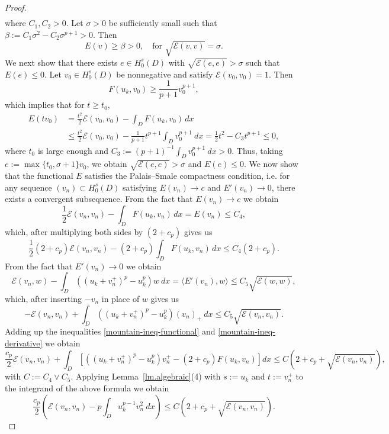 \documentclass[11pt,a4paper,reqno]{amsart}
\theoremstyle{definition}
\numberwithin{equation}{section}
\begin{document}
\begin{proof}
\begin{align*}
\end{align*}
where $C_1,C_2>0$. Let $\sigma>0$ be sufficiently small such that $\beta:=C_1\sigma^2-C_2\sigma^{p+1}>0$. Then
\[
E(v)\ge \beta>0,\quad \text{for }\sqrt{\mathcal E(v,v)}=\sigma.
\]
We next show that there exists $e\in H^s_0(D)$ with $\sqrt{\mathcal E(e,e)}>\sigma$ such that $E(e)\le 0$. 
Let $v_0\in H^s_0(D)$ be nonnegative and satisfy $\mathcal E(v_0,v_0)=1$. Then
\[
F(u_k,v_0)\ge \frac{1}{p+1}v_0^{p+1},
\]
which implies that for $t\ge t_0$,
\[
\begin{split}
E(tv_0)&=\frac{t^2}{2}\mathcal E(v_0,v_0)-\int_D F(u_k,v_0)\,dx\\&
\le \frac{t^2}{2}\mathcal E(v_0,v_0)-\frac{1}{p+1}t^{p+1}\int_D v_0^{p+1}\ dx= \frac{1}{2}t^2-C_3t^{p+1}\le 0,
\end{split}
\]
where $t_0$ is large enough and $C_3:=(p+1)^{-1}\int_D v_0^{p+1}\ dx>0$. Thus, taking $e:=\max\{t_0,\sigma+1\}v_0$, we obtain $\sqrt{\mathcal E(e,e)}>\sigma$ and $E(e)\le0$.
We now show that the functional $E$ satisfies the Palais–Smale compactness condition, i.e. for any sequence $(v_n)\subset H^s_0(D)$ 
satisfying $E(v_n)\to c$ and $E'(v_n)\to0$, 
there exists a convergent subsequence. 
From the fact that $E(v_n)\to c$ we obtain
\[
\frac{1}{2}\mathcal E(v_n,v_n)-\int_D F(u_k,v_n)\,dx=E(v_n)\le C_4,
\]
which, after multiplying both sides by $(2+c_p)$ gives us
\begin{equation}\label{mountain-ineq-functional}
\frac{1}{2}(2+c_p)\mathcal E(v_n,v_n)-(2+c_p)\int_D F(u_k,v_n)\,dx\le C_4(2+c_p).
\end{equation}
From the fact that $E'(v_n)\to 0$ we obtain
\[
\mathcal{E}(v_n,w)-\int_D \left((u_k+v_n^+)^p-u_k^p\right)w\ dx=\langle E'(v_n), w\rangle \le C_5\sqrt{\mathcal E(w,w)},
\]
which, after inserting $-v_n$ in place of $w$ gives us
\begin{equation}\label{mountain-ineq-derivative}
-\mathcal E(v_n,v_n)+\int_D \left((u_k+v_n^+)^p-u_k^p\right)(v_n)_+\ dx\le C_5\sqrt{\mathcal E(v_n,v_n)}.
\end{equation}
Adding up the inequalities \eqref{mountain-ineq-functional} and \eqref{mountain-ineq-derivative} we obtain
\[
\frac{c_p}{2}\mathcal E(v_n,v_n)+\int_D \left[\left((u_k+v_n^+)^p-u_k^p\right)v_n^+-(2+c_p)F(u_k,v_n)\right]dx\le C(2+c_p+\sqrt{\mathcal E(v_n,v_n)}),
\]
with $C:=C_4\vee C_5$.
Applying Lemma~\ref{lm.algebraic}(4) with $s:=u_k$ and $t:=v_n^+$ 
to the integrand of the above formula we obtain
\[
\frac{c_p}{2}\left(\mathcal E(v_n,v_n)-p\int_D u_k^{p-1}v_n^2\ dx\right)\le C(2+c_p+\sqrt{\mathcal E(v_n,v_n)}).
\]
\end{proof}
\end{document}
